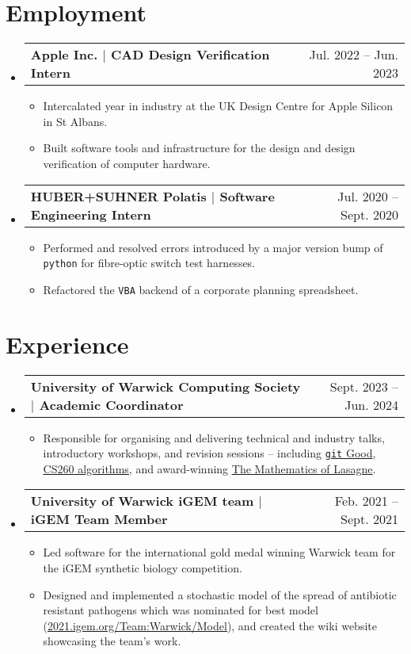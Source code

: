 \documentclass[letterpaper,11pt]{article}
\makeatletter
\newcommand{\resumeItem}[1]{
  \item\small{
    {#1 \vspace{-2pt}}
  }
}
\newcommand{\resumeProjectHeading}[2]{
    \item
    \begin{tabular*}{0.97\textwidth}{l@{\extracolsep{\fill}}r}
      \textbf{#1} & #2 \\
    \end{tabular*}\vspace{-7pt}
}
\newcommand{\resumeSubHeadingListStart}{\begin{itemize}[leftmargin=0.15in, label={}]}
\newcommand{\resumeSubHeadingListEnd}{\end{itemize}}
\newcommand{\resumeItemListStart}{\begin{itemize}[leftmargin=0.2in]}
\newcommand{\resumeItemListEnd}{\end{itemize}\vspace{-5pt}}
\makeatother
\begin{document}
\section{Employment}
  \resumeSubHeadingListStart
    \resumeProjectHeading
      {Apple Inc. $|$ CAD Design Verification Intern}{Jul. 2022 -- Jun. 2023}
      \resumeItemListStart
        \resumeItem{Intercalated year in industry at the UK Design Centre for Apple Silicon in St Albans.}
        \resumeItem{Built software tools and infrastructure for the design and design verification of computer hardware.}
      \resumeItemListEnd
    \resumeProjectHeading
      {HUBER+SUHNER Polatis $|$ Software Engineering Intern}{Jul. 2020 -- Sept. 2020}
      \resumeItemListStart
        \resumeItem{Performed and resolved errors introduced by a major version bump of \texttt{python} for fibre-optic switch test harnesses.}
        \resumeItem{Refactored the \texttt{VBA} backend of a corporate planning spreadsheet.}
      \resumeItemListEnd
      \resumeSubHeadingListEnd

\section{Experience}
  \resumeSubHeadingListStart
    \resumeProjectHeading
      {University of Warwick Computing Society $|$ Academic Coordinator}{Sept. 2023 -- Jun. 2024}
      \resumeItemListStart
        \resumeItem{Responsible for organising and delivering technical and industry talks, introductory workshops, and revision sessions -- including \href{https://uwcs.co.uk/resources/git-good/}{\underline{\texttt{git} Good}}, \href{https://youtu.be/o1bSND4SSLM}{\underline{CS260 algorithms}}, and award-winning \href{https://www.youtube.com/watch?v=9l9hcSIAAtM}{\underline{The Mathematics of Lasagne}}.}
      \resumeItemListEnd
    \resumeProjectHeading
      {University of Warwick iGEM team $|$ iGEM Team Member}{Feb. 2021 -- Sept. 2021}
      \resumeItemListStart
        \resumeItem{Led software for the international gold medal winning Warwick team for the iGEM synthetic biology competition.}
        \resumeItem{Designed and implemented a stochastic model of the spread of antibiotic resistant pathogens which was nominated for best model (\href{https://2021.igem.org/Team:Warwick/Model}{\underline{2021.igem.org/Team:Warwick/Model}}), and created the wiki website showcasing the team's work.}
    \resumeItemListEnd
  \resumeSubHeadingListEnd

\end{document}
